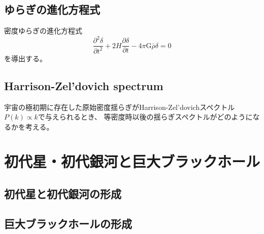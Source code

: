 \documentclass[a4paper,papersize,uplatex,dvipdfmx,10pt]{jsarticle}
\begin{document}
\subsection{ゆらぎの進化方程式}
密度ゆらぎの進化方程式
\begin{equation}
  \frac{\partial^{2} \delta}{\partial t^{2}}+2H\frac{\partial \delta}{\partial t}-4\pi\mathrm{G}\bar{\rho}\delta=0
\end{equation}
を導出する。

\subsection{Harrison-Zel'dovich spectrum}
宇宙の極初期に存在した原始密度揺らぎがHarrison-Zel’dovichスペクトル$P(k) \propto k$で与えられるとき、 等密度時以後の揺らぎスペクトルがどのようになるかを考える。

\section{初代星・初代銀河と巨大ブラックホール}
\subsection{初代星と初代銀河の形成}

\subsection{巨大ブラックホールの形成}


%
%
\end{document}
